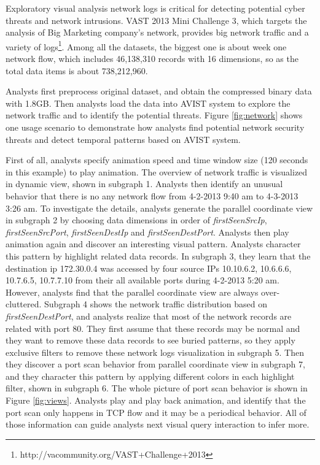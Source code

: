\documentclass[journal]{vgtc}                %
\begin{document}
{Exploratory visual analysis network logs is critical for detecting potential cyber threats and network intrusions. VAST 2013 Mini Challenge 3, which targets the analysis of Big Marketing company's network, provides big network traffic and a variety of logs\footnote{http://vacommunity.org/VAST+Challenge+2013}. Among all the datasets,  the biggest one is about week one network flow, which includes 46,138,310 records with 16 dimensions, so as the total data items is about 738,212,960. 

Analysts first preprocess original dataset, and obtain the compressed binary data with 1.8GB. Then analysts load the data into AVIST system to explore the network traffic and to identify the potential threats. Figure \ref{fig:network} shows one usage scenario to demonstrate how analysts find potential network security threats and detect temporal patterns based on AVIST system. 

First of all, analysts specify animation speed and time window size (120 seconds in this example) to play animation. The overview of network traffic is visualized in dynamic view, shown in subgraph 1. Analysts then identify an unusual behavior that there is no any network flow from 4-2-2013 9:40 am to 4-3-2013 3:26 am. To investigate the details, analysts generate the parallel coordinate view in subgraph 2 by choosing data dimensions in order of \emph{firstSeenSrcIp}, \emph{firstSeenSrcPort}, \emph{firstSeenDestIp} and \emph{firstSeenDestPort}. Analysts then play animation again and discover an interesting visual pattern. Analysts character this pattern by highlight related data records. In subgraph 3, they learn that the destination ip 172.30.0.4 was accessed by four source IPs 10.10.6.2, 10.6.6.6, 10.7.6.5, 10.7.7.10 from their all available ports during 4-2-2013 5:20 am. However, analysts find that the parallel coordinate view are always over-cluttered.  Subgraph 4 shows the network traffic distribution based on \emph{firstSeenDestPort}, and analysts realize that most of the network records are related with port 80. They first assume that these records may be normal and they want to remove these data records to see buried patterns, so they apply exclusive filters to remove these network logs visualization in subgraph 5. Then they discover a port scan behavior from parallel coordinate view in subgraph 7, and they character this pattern by applying different colors in each highlight filter, shown in subgraph 6.  The whole picture of port scan behavior is shown in Figure \ref{fig:views}. Analysts play and play back animation, and identify that the port scan only happens in TCP flow and it may be a periodical behavior. All of those information can guide analysts next visual query interaction to infer more.


}
\end{document}
